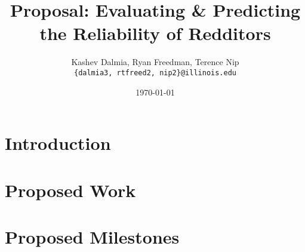 \documentclass[a4paper]{article}
\title{Proposal: Evaluating \& Predicting the Reliability of Redditors}
\author{Kashev Dalmia, Ryan Freedman, Terence Nip \\
        \texttt{\{dalmia3, rtfreed2, nip2\}@illinois.edu}
       }
\date{\today}
\begin{document}
\maketitle

\section{Introduction}
\label{sec:introduction}


\section{Proposed Work}
\label{sec:proposed_work}


\section{Proposed Milestones}
\label{sec:proposed_milestones}

\end{document}
